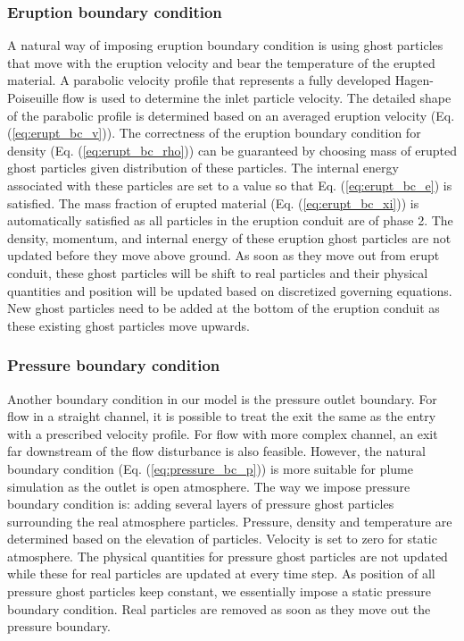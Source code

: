 \documentclass[journal abbreviation, manuscript]{copernicus}
\begin{document}
\subsubsection{Eruption boundary condition}
A natural way of imposing eruption boundary condition is using ghost particles that move with the eruption velocity and bear the temperature of the erupted material. A parabolic velocity profile that represents a fully developed Hagen-Poiseuille flow is used to determine the inlet particle velocity. The detailed shape of the parabolic profile is determined based on an averaged eruption velocity (Eq. (\ref{eq:erupt_bc_v})). The correctness of the eruption boundary condition for density (Eq. (\ref{eq:erupt_bc_rho})) can be guaranteed by choosing mass of erupted ghost particles given distribution of these particles. The internal energy associated with these particles are set to a value so that Eq. (\ref{eq:erupt_bc_e}) is satisfied. The mass fraction of erupted material (Eq. (\ref{eq:erupt_bc_xi})) is automatically satisfied as all particles in the eruption conduit are of phase 2. The density, momentum, and internal energy of these eruption ghost particles are not updated before they move above ground. As soon as they move out from erupt conduit, these ghost particles will be shift to real particles and their physical quantities and position will be updated based on discretized governing equations. New ghost particles need to be added at the bottom of the eruption conduit as these existing ghost particles move upwards.

\subsubsection{Pressure boundary condition}
Another boundary condition in our model is the pressure outlet boundary. For flow in a straight channel, it is possible to treat the exit the same as the entry with a prescribed velocity profile. For flow with more complex channel, an exit far downstream of the flow disturbance is also feasible. However, the natural boundary condition (Eq.  (\ref{eq:pressure_bc_p})) is more suitable for plume simulation as the outlet is open atmosphere. The way we impose pressure boundary condition is: adding several layers of pressure ghost particles surrounding the real atmosphere particles. Pressure, density and temperature are determined based on the elevation of particles. Velocity is set to zero for static atmosphere. The physical quantities for pressure ghost particles are not updated while these for real particles are updated at every time step. As position of all pressure ghost particles keep constant, we essentially impose a static pressure boundary condition. Real particles are removed as soon as they move out the pressure boundary.
\end{document}
